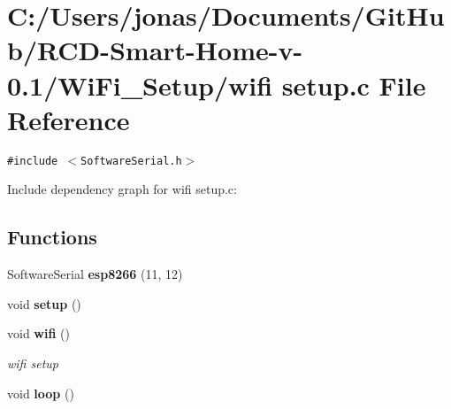 \section{C:/Users/jonas/Documents/Git\-Hub/RCD-Smart-Home-v-0.1/Wi\-Fi\_\-Setup/wifi setup.c File Reference}
\label{wifi_01setup_8c}
{\tt \#include $<$Software\-Serial.h$>$}\par


Include dependency graph for wifi setup.c:\subsection*{Functions}
\begin{CompactItemize}
\item 
Software\-Serial {\bf esp8266} (11, 12)
\item 
void {\bf setup} ()
\item 
void {\bf wifi} ()
\begin{CompactList}\small\item\em wifi setup \item\end{CompactList}\item 
void {\bf loop} ()
\end{CompactItemize}
